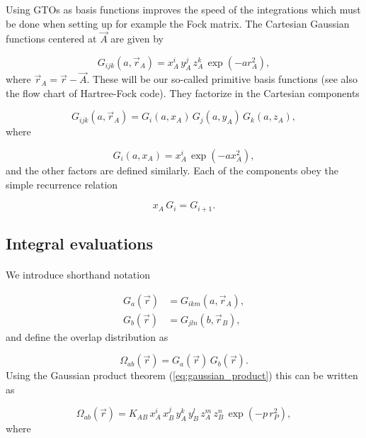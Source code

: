 \documentclass[%
twoside,                 %
final,                   %
10pt]{article}
\begin{document}
Using GTOs as basis functions improves the speed of the integrations which must be done when setting up 
for example the Fock matrix.
The Cartesian Gaussian functions centered at $\vec A$ are given by

\begin{equation}
 G_{ijk}(a, \vec r_A) = x^i_A\,y^j_A\,z^k_A\,\exp(-a r^2_A),
\end{equation}
where $\vec r_A = \vec r - \vec A$. These will be our so-called primitive basis functions (see also the flow chart of Hartree-Fock code). 
They factorize in the Cartesian components

\begin{equation}
 G_{ijk}(a, \vec r_A) = G_i(a, x_A)\,G_j(a, y_A)\,G_k(a, z_A),
\end{equation}
where

\begin{equation}
 G_i(a, x_A) = x^i_A\,\exp(-a x^2_A),
\end{equation}
and the other factors are defined similarly. Each of the components obey the simple recurrence relation

\begin{equation}
 x_A\,G_i = G_{i+1}.
\end{equation}



\subsection{Integral evaluations}

\paragraph{}

We introduce  shorthand notation

\begin{align}
  G_a(\vec r) & = G_{ikm}(a, \vec r_A), \\
  G_b(\vec r) & = G_{jln}(b, \vec r_B),
\end{align}
and define the overlap distribution  as

\begin{equation}
 \Omega_{ab}(\vec r) = G_a(\vec r)\,G_b(\vec r).
\end{equation}
Using the Gaussian product theorem (\ref{eq:gaussian_product}) this can be written as

\begin{equation}
 \Omega_{ab}(\vec r) = K_{AB}\,x^i_A\,x^j_B\,y^k_A\,y^l_B\,z^m_A\,z^n_B\,\exp(-p\,r^2_P),
\end{equation}
where
\end{document}
